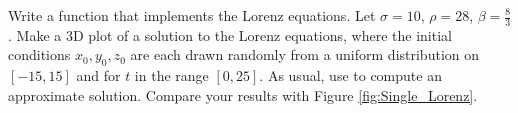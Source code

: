 \begin{problem}
Write a function that implements the Lorenz equations. Let $\sigma=10$, $\rho=28$, $\beta=\frac{8}{3}$. 
Make a 3D plot of a solution to the Lorenz equations, where the initial conditions $x_0,y_0,z_0$ are each drawn randomly from a uniform distribution on $[-15,15]$ and for \(t\) in the range \([0,25]\). 
As usual, use  to compute an approximate solution. 
Compare your results with Figure \ref{fig:Single_Lorenz}.
\end{problem}


